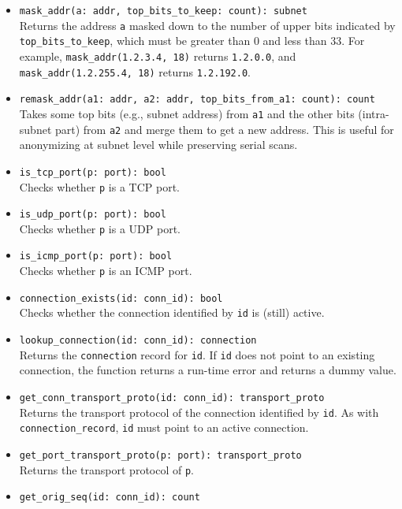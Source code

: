 \documentclass[10pt,landscape]{article}
\begin{document}
\begin{multicols*}{2}
\begin{itemize}
  \item \verb|mask_addr(a: addr, top_bits_to_keep: count): subnet|\\
    Returns the address \verb|a| masked down to the number of upper bits
    indicated by \verb|top_bits_to_keep|, which must be greater than 0 and less
    than 33. For example, \verb|mask_addr(1.2.3.4, 18)| returns \verb|1.2.0.0|,
    and \verb|mask_addr(1.2.255.4, 18)| returns \verb|1.2.192.0|.
  \item \verb|remask_addr(a1: addr, a2: addr, top_bits_from_a1: count): count|\\
    Takes some top bits (e.g., subnet address) from \texttt{a1} and the other
    bits (intra-subnet part) from \texttt{a2} and merge them to get a new
    address. This is useful for anonymizing at subnet level while preserving
    serial scans.
  \item \verb|is_tcp_port(p: port): bool|\\
    Checks whether \texttt{p} is a TCP port.
  \item \verb|is_udp_port(p: port): bool|\\
    Checks whether \texttt{p} is a UDP port.
  \item \verb|is_icmp_port(p: port): bool|\\
    Checks whether \texttt{p} is an ICMP port.
  \item \verb|connection_exists(id: conn_id): bool|\\
    Checks whether the connection identified by \texttt{id} is (still) active.
  \item \verb|lookup_connection(id: conn_id): connection|\\
    Returns the \texttt{connection} record for \texttt{id}. If
    \texttt{id} does not point to an existing connection, the function returns
    a run-time error and returns a dummy value.
  \item \verb|get_conn_transport_proto(id: conn_id): transport_proto|\\
    Returns the transport protocol of the connection identified by \texttt{id}.
    As with \verb|connection_record|, \texttt{id} must point to an active
    connection.
  \item \verb|get_port_transport_proto(p: port): transport_proto|\\
    Returns the transport protocol of \texttt{p}.
  \item \verb|get_orig_seq(id: conn_id): count|\\

\end{itemize}
\end{multicols*}
\end{document}
